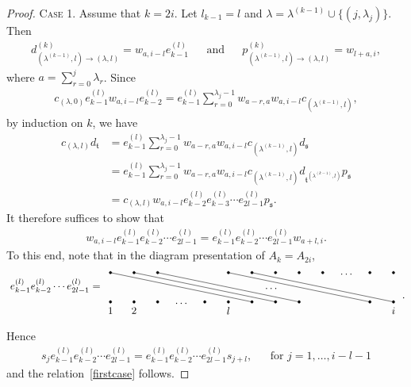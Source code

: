 \documentclass[11pt,a4paper,reqno,svgnames]{amsart}
\theoremstyle{plain}
\theoremstyle{definition}
\numberwithin{equation}{section}
\begin{document}
\begin{proof}
\textsc{Case 1.} Assume that $k=2i$. Let  $l_{k-1}=l$ and  $\lambda=\lambda^{(k-1)}\cup\lbrace(j,\lambda_j)\rbrace$.  Then 
\begin{align*}
d_{(\lambda^{(k-1)},l)\to(\lambda,l)}^{(k)}=w_{a,i-l}e_{k-1}^{(l)}&&\text{and}&& p_{(\lambda^{(k-1)},l)\to(\lambda,l)}^{(k)}=w_{l+a,i},
\end{align*}
where $a=\sum_{r=0}^{j}\lambda_r$. Since 
\begin{align*}
c_{(\lambda,0)}e_{k-1}^{(l)}w_{a,i-l}e_{k-2}^{(l)}= e_{k-1}^{(l)}\sum_{r=0}^{\lambda_j-1}w_{a-r,a}w_{a,i-l} c_{(\lambda^{(k-1)},l)},
\end{align*}
by induction on $k$, we have 
\begin{align*}
c_{(\lambda,l)}d_\mathfrak{t}&= e_{k-1}^{(l)}\sum_{r=0}^{\lambda_j-1}w_{a-r,a}w_{a,i-l} c_{(\lambda^{(k-1)},l)} d_{\mathfrak{s}}\\
&=e_{k-1}^{(l)}\sum_{r=0}^{\lambda_j-1}w_{a-r,a}w_{a,i-l} c_{(\lambda^{(k-1)},l)} d_{\mathfrak{t}^{(\lambda^{(k-1)},l)}} p_{\mathfrak{s}}\\
&= c_{(\lambda,l)}w_{a,i-l}e_{k-2}^{(l)} e_{k-3}^{(l)}\cdots e_{2l-1}^{(l)}p_\mathfrak{s}. 
\end{align*}
It therefore suffices to show that 
\begin{align}\label{firstcase}
w_{a,i-l}e_{k-1}^{(l)} e_{k-2}^{(l)}\cdots e_{2l-1}^{(l)}=e_{k-1}^{(l)} e_{k-2}^{(l)}\cdots e_{2l-1}^{(l)}w_{a+l,i}. 
\end{align}
To this end,  note that in the diagram presentation of $A_k=A_{2i}$, 
\begin{align*}
\begin{matrix}
\begin{tikzpicture}
\foreach \x in {1,1.8,2.6}
\filldraw [black] (\x,1) circle (1.2pt);
\foreach \x in {1,1.8,2.6}
\filldraw [black] (\x,0) circle (1.2pt);
\node at (3.4,-0.05) {$\displaystyle\ldots \color{black}$};
\foreach \x in {4.2,5.0,5.8,6.6,7.4}
\filldraw [black] (\x,0) circle (1.2pt);
\foreach \x in {5.0,5.8,6.6,7.4,8.2}
\filldraw [black] (\x,1) circle (1.2pt);
\node at (9.0,0.95) {$\displaystyle\ldots \color{black}$};
\foreach \x in {9.8,10.6}
\filldraw [black] (\x,1) circle (1.2pt);
\foreach \x in {9.8,10.6}
\filldraw [black] (\x,0) circle (1.2pt);
\draw (1,1) -- (5.8,0);
\draw (1.8,1) -- (6.6,0);
\draw (2.6,1) -- (7.4,0);
\draw (5.0,1) -- (9.8,0);
\draw (5.8,1) -- (10.6,0);
\node at (6.45,0.46) {$\displaystyle\ldots \color{black}$};
\node at (1,-0.3) {$1$};
\node at (1.8,-0.3) {$2$};
\node at (5.0,-0.3) {$l$};
\node at (10.6,-0.3) {$i$};
\node at (-0.87,0.55) {$e_{k-1}^{(l)}e_{k-2}^{(l)}\cdots e_{2l-1}^{(l)}=$};
\end{tikzpicture}
\end{matrix}\ .
\end{align*}
Hence 
\begin{align}\label{abraid}
s_je_{k-1}^{(l)}e_{k-2}^{(l)}\cdots e_{2l-1}^{(l)}=e_{k-1}^{(l)}e_{k-2}^{(l)}\cdots e_{2l-1}^{(l)}s_{j+l},&&\text{for $j=1,\ldots,i-l-1$}
\end{align}
and the relation~\eqref{firstcase} follows.


\end{proof}
\end{document}
